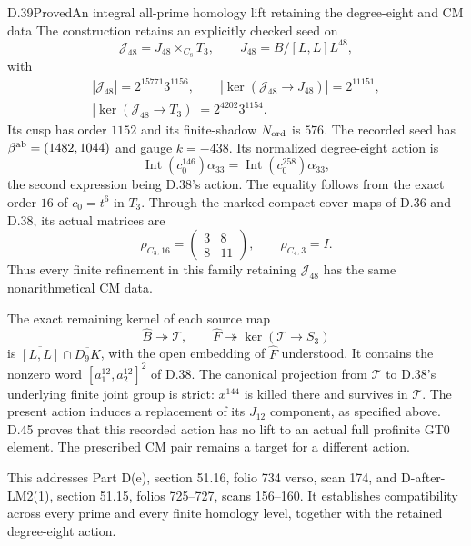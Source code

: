 \begin{statement}{D.39}{Proved}{An integral all-prime homology lift retaining the degree-eight and CM data}
The construction retains an explicitly checked seed on
\[
 \mathcal J_{48}=J_{48}\mathbin{\times_{C_8}}T_3,
 \qquad J_{48}=B/[L,L]L^{48},                               \tag{D.39.4}
\]
with
\[
 \begin{gathered}
 |\mathcal J_{48}|=2^{15771}3^{1156},\qquad
 |\ker(\mathcal J_{48}\to J_{48})|=2^{11151},\\
 |\ker(\mathcal J_{48}\to T_3)|=2^{4202}3^{1154}.
 \end{gathered}                                               \tag{D.39.5}
\]
Its cusp has order $1152$ and its finite-shadow $N_{\rm ord}$
is $576$. The recorded seed has $\beta^{\rm ab}=(1482,1044)$
and gauge $k=-438$. Its normalized degree-eight action is
\[
 \operatorname{Int}(c_0^{146})\alpha_{33}
   =\operatorname{Int}(c_0^{258})\alpha_{33},                 \tag{D.39.6}
\]
the second expression being D.38's action. The equality follows
from the exact order $16$ of $c_0=t^6$ in $T_3$.
Through the marked compact-cover maps of D.36 and D.38, its
actual matrices are
\[
 \rho_{C_3,16}=\begin{pmatrix}3&8\\8&11\end{pmatrix},
 \qquad \rho_{C_4,3}=I.                                     \tag{D.39.7}
\]
Thus every finite refinement in this family retaining
$\mathcal J_{48}$ has the same nonarithmetical CM data.

The exact remaining kernel of each source map
\[
 \widehat B\twoheadrightarrow\mathcal T,\qquad
 \widehat F\twoheadrightarrow\ker(\mathcal T\to S_3)
\]
is $\overline{[L,L]}\cap\overline{D_9K}$, with the open
embedding of $\widehat F$ understood. It contains the nonzero
word $[a_1^{12},a_2^{12}]^2$ of D.38. The canonical projection
from $\mathcal T$ to D.38's underlying finite joint group is
strict: $x^{144}$ is killed there and survives in $\mathcal T$.
The present action induces a replacement of its $J_{12}$
component, as specified above. D.45 proves that this recorded action has no lift to an
actual full profinite GT0 element. The prescribed CM pair
remains a target for a different action.

This addresses Part D(e), section 51.16, folio 734 verso,
scan 174, and D-after-LM2(1), section 51.15, folios 725--727,
scans 156--160. It establishes compatibility across every
prime and every finite homology level, together with the
retained degree-eight action.
\end{statement}

